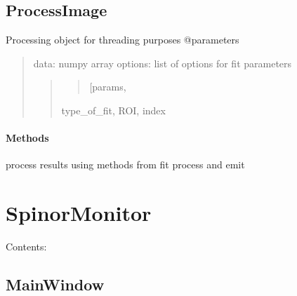 \documentclass[letterpaper,10pt,english]{sphinxmanual}
\begin{document}
\subsection{ProcessImage}
\label{ProcessImage::doc}\label{ProcessImage:processimage}

\begin{fulllineitems}
\label{ProcessImage:Image.ProcessImage}
Processing object for threading purposes
@parameters
\begin{quote}

data: numpy array
options: list of options for fit parameters
\begin{quote}
\begin{quote}

{[}params,
\end{quote}

type\_of\_fit,
ROI,
index
\end{quote}
\end{quote}
\paragraph{Methods}

\begin{fulllineitems}
\label{ProcessImage:Image.ProcessImage.run}
process results using methods from fit process and emit

\end{fulllineitems}


\end{fulllineitems}



\section{SpinorMonitor}
\label{SpinorMonitor::doc}\label{SpinorMonitor:spinormonitor}
Contents:


\subsection{MainWindow}
\label{MainWindow::doc}\label{MainWindow:mainwindow}
\end{document}

